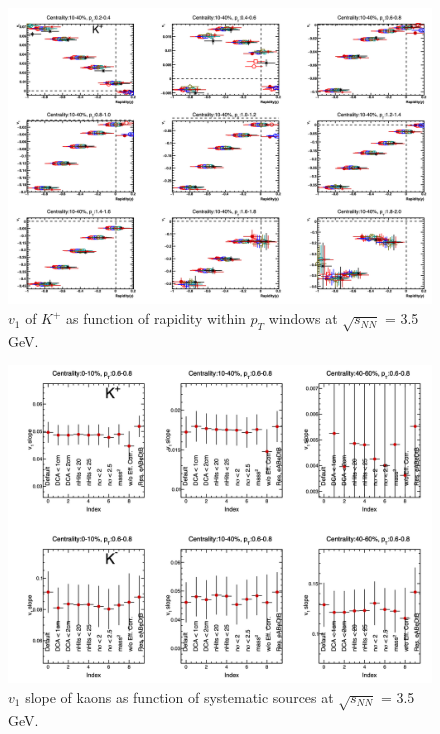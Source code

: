 \begin{figure}[hbt!]
\centering
\includegraphics[width=0.95\linewidth]{figures/chapter03/3p5gev_kaonplus_v1yPt_sysUnc.png}
\caption{$v_1$ of $K^+$ as function of rapidity within $p_T$ windows at $\sqrt{s_{NN}}$ = 3.5 GeV.}
\label{fig:3p5gev_kaonplus_v1yPt_sysUnc}
\end{figure}

\begin{figure}[hbt!]
\centering
\includegraphics[width=0.85\linewidth]{figures/chapter03/3p5gev_kaon_v1slopeIndex_sysUnc.png}
\caption{$v_1$ slope of kaons as function of systematic sources at $\sqrt{s_{NN}}$ = 3.5 GeV.}
\label{fig:3p5gev_kaon_v1slopeIndex_sysUnc}
\end{figure}

